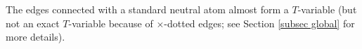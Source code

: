 \documentclass{article}
\newcommand{\1}{\mathds{1}}
\numberwithin{equation}{section}
\newcommand{\be}{\begin{equation}}
\newcommand{\ee}{\end{equation}}
\renewcommand{\cal}{\mathcal}
\theoremstyle{plain} %
\theoremstyle{remark}
\begin{document}
The edges connected with a standard neutral atom almost form a $T$-variable (but not an exact $T$-variable because of $\times$-dotted edges; see Section \ref{subsec global} for more details).


 
\end{document}
